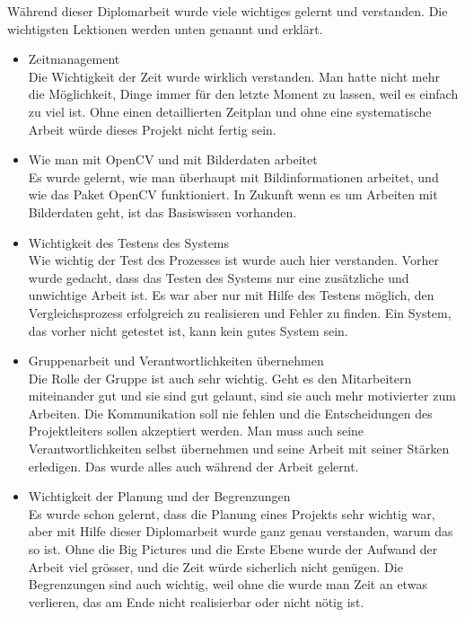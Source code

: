 Während dieser Diplomarbeit wurde viele wichtiges gelernt und verstanden. Die wichtigsten Lektionen werden unten genannt und erklärt.\\
\begin{itemize}
	\item Zeitmanagement \\
	
	Die Wichtigkeit der Zeit wurde wirklich verstanden. Man hatte nicht mehr die Möglichkeit, Dinge immer für den letzte Moment zu lassen, weil es einfach zu viel ist. Ohne einen detaillierten Zeitplan und ohne eine systematische Arbeit würde dieses Projekt nicht fertig sein.
	
	\item Wie man mit OpenCV und mit Bilderdaten arbeitet\\
	
	Es wurde gelernt, wie man überhaupt mit Bildinformationen arbeitet, und wie das Paket OpenCV funktioniert. In Zukunft wenn es um Arbeiten mit Bilderdaten geht, ist das Basiswissen vorhanden.
	
	\item Wichtigkeit des Testens des Systems\\
	
	Wie wichtig der Test des Prozesses ist wurde auch hier verstanden. Vorher wurde gedacht, dass das Testen des Systems nur eine zusätzliche und unwichtige Arbeit ist. Es war aber nur mit Hilfe des Testens möglich, den Vergleichsprozess erfolgreich zu realisieren und Fehler zu finden. Ein System, das vorher nicht getestet ist, kann kein gutes System sein.
	
	\item Gruppenarbeit und Verantwortlichkeiten übernehmen \\
	
	Die Rolle der Gruppe ist auch sehr wichtig. Geht es den Mitarbeitern miteinander gut und sie sind gut gelaunt, sind sie auch mehr motivierter zum Arbeiten. Die Kommunikation soll nie fehlen und die Entscheidungen des Projektleiters sollen akzeptiert werden. Man muss auch seine Verantwortlichkeiten selbst übernehmen und seine Arbeit mit seiner Stärken erledigen. Das wurde alles auch während der Arbeit gelernt.
	
	\item Wichtigkeit der Planung und der Begrenzungen \\
	
	Es wurde schon gelernt, dass die Planung eines Projekts sehr wichtig war, aber mit Hilfe dieser Diplomarbeit wurde ganz genau verstanden, warum das so ist. Ohne die Big Pictures und die Erste Ebene wurde der Aufwand der Arbeit viel grösser, und die Zeit würde sicherlich nicht genügen. Die Begrenzungen sind auch wichtig, weil ohne die wurde man Zeit an etwas verlieren, das am Ende nicht realisierbar oder nicht nötig ist.
	

\end{itemize}

